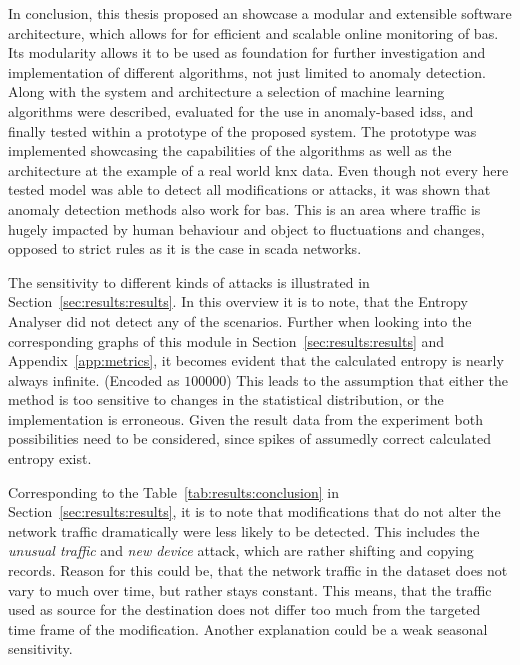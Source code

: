 In conclusion, this thesis proposed an showcase a modular and extensible software architecture, which allows for for efficient and scalable online monitoring of \gls{bas}.
Its modularity allows it to be used as foundation for further investigation and implementation of different algorithms, not just limited to anomaly detection.
Along with the system and architecture a selection of machine learning algorithms were described, evaluated for the use in anomaly-based \glspl{ids}, and finally tested within a prototype of the proposed system.
The prototype was implemented showcasing the capabilities of the algorithms as well as the architecture at the example of a real world \gls{knx} data.
Even though not every here tested model was able to detect all modifications or attacks, it was shown that anomaly detection methods also work for \gls{bas}. This is an area where traffic is hugely impacted by human behaviour and object to fluctuations and changes, opposed to strict rules as it is the case in \gls{scada} networks.

The sensitivity to different kinds of attacks is illustrated in Section~\ref{sec:results:results}.
In this overview it is to note, that the Entropy Analyser did not detect any of the scenarios. Further when looking into the corresponding graphs of this module in Section~\ref{sec:results:results} and Appendix~\ref{app:metrics}, it becomes evident that the calculated entropy is nearly always infinite. (Encoded as \(100 000\)) 
This leads to the assumption that either the method is too sensitive to changes in the statistical distribution, or the implementation is erroneous. Given the result data from the experiment both possibilities need to be considered, since spikes of assumedly correct calculated entropy exist.

Corresponding to the Table~\ref{tab:results:conclusion} in Section~\ref{sec:results:results}, it is to note that modifications that do not alter the network traffic dramatically were less likely to be detected. This includes the \emph{unusual traffic} and \emph{new device} attack, which are rather shifting and copying records.
Reason for this could be, that the network traffic in the dataset does not vary to much over time, but rather stays constant.
This means, that the traffic used as source for the destination does not differ too much from the targeted time frame of the modification.
Another explanation could be a weak seasonal sensitivity.

